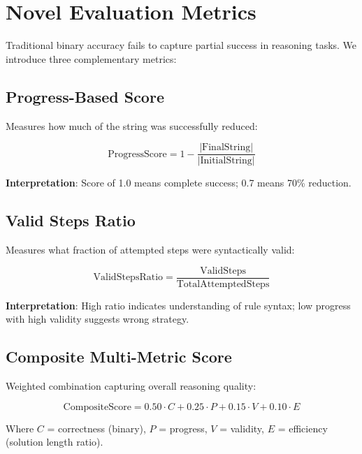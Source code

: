 \documentclass[11pt,a4paper]{article}
\begin{document}
\section{Novel Evaluation Metrics}

Traditional binary accuracy fails to capture partial success in reasoning tasks. We introduce three complementary metrics:

\subsection{Progress-Based Score}

Measures how much of the string was successfully reduced:

\begin{equation}
\text{ProgressScore} = 1 - \frac{|\text{FinalString}|}{|\text{InitialString}|}
\end{equation}

\textbf{Interpretation}: Score of 1.0 means complete success; 0.7 means 70\% reduction.

\subsection{Valid Steps Ratio}

Measures what fraction of attempted steps were syntactically valid:

\begin{equation}
\text{ValidStepsRatio} = \frac{\text{ValidSteps}}{\text{TotalAttemptedSteps}}
\end{equation}

\textbf{Interpretation}: High ratio indicates understanding of rule syntax; low progress with high validity suggests wrong strategy.

\subsection{Composite Multi-Metric Score}

Weighted combination capturing overall reasoning quality:

\begin{equation}
\text{CompositeScore} = 0.50 \cdot C + 0.25 \cdot P + 0.15 \cdot V + 0.10 \cdot E
\end{equation}

Where $C$ = correctness (binary), $P$ = progress, $V$ = validity, $E$ = efficiency (solution length ratio).
\end{document}
